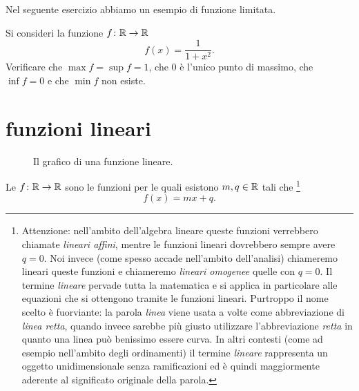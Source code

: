 Nel seguente esercizio abbiamo un esempio di funzione limitata.
\begin{exercise}
Si consideri la funzione $f\colon \mathbb R\to\mathbb R$
\[
 f(x) = \frac{1}{1+x^2}.
\]
Verificare che $\max f = \sup f = 1$, che $0$ è l'unico punto di massimo,
che $\inf f = 0$ e che $\min f$ non esiste.
\end{exercise}

\section{funzioni lineari}

\begin{figure}
  \begin{center}
  \end{center}
  \caption{Il grafico di una funzione lineare.}
  \label{fig:funzione_lineare}
\end{figure}

Le 
$f\colon \mathbb R \to \mathbb R$ sono le funzioni per le quali
esistono $m,q\in\mathbb R$ tali che%
\footnote{%
Attenzione: nell'ambito dell'algebra lineare queste
funzioni verrebbero chiamate \emph{lineari affini}, mentre
le funzioni lineari dovrebbero sempre avere $q=0$.
Noi invece (come spesso accade nell'ambito dell'analisi)
chiameremo lineari queste funzioni e chiameremo
\emph{lineari omogenee} quelle con $q=0$.
Il termine \emph{lineare} pervade tutta la matematica 
e si applica in particolare alle equazioni che si ottengono 
tramite le funzioni lineari.
Purtroppo il nome scelto è fuorviante: la parola \emph{linea} viene 
usata a volte come abbreviazione di \emph{linea retta}, quando 
invece sarebbe più giusto utilizzare l'abbreviazione \emph{retta}
in quanto una linea può benissimo essere curva.
In altri contesti (come ad esempio nell'ambito degli ordinamenti)
il termine \emph{lineare} rappresenta un oggetto unidimensionale
senza ramificazioni ed è quindi maggiormente aderente 
al significato originale della parola.
}
\[
  f(x) = mx + q.
\]

